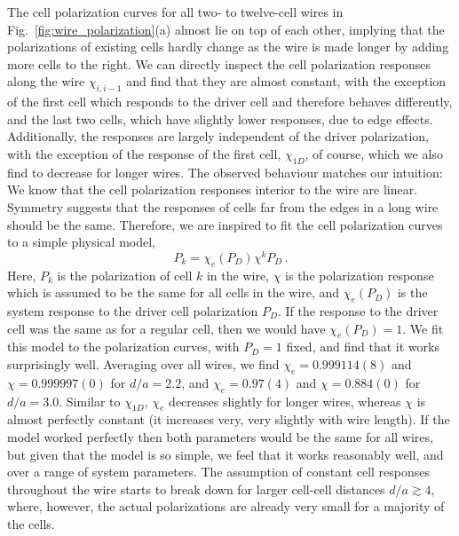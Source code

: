 The cell polarization curves for all two- to twelve-cell wires in
Fig.~\ref{fig:wire_polarization}(a) almost lie on top of each other, implying
that the polarizations of existing cells hardly change as the wire is made
longer by adding more cells to the right. We can directly inspect the cell
polarization responses along the wire $\chi_{i,i-1}$ and find that they are
almost constant, with the exception of the first cell which responds to the
driver cell and therefore behaves differently, and the last two cells, which
have slightly lower responses, due to edge effects. Additionally, the responses
are largely independent of the driver polarization, with the exception of the
response of the first cell, $\chi_{1D}$, of course, which we also find to
decrease for longer wires. The observed behaviour matches our intuition: We
know that the cell polarization responses interior to the wire are linear.
Symmetry suggests that the responses of cells far from the edges in a long wire
should be the same. Therefore, we are inspired to fit the cell polarization
curves to a simple physical model, 
%
\begin{equation}
  \label{eq:simple_model}
  P_k = \chi_e(P_D) \chi^k P_D \, .
\end{equation}
%
Here, $P_k$ is the polarization of cell $k$ in the wire, $\chi$ is the
polarization response which is assumed to be the same for all cells in the wire,
and $\chi_e(P_D)$ is the system response to the driver cell polarization $P_D$.
If the response to the driver cell was the same as for a regular cell, then we
would have $\chi_e(P_D) = 1$. We fit this model to the polarization curves, with
$P_D = 1$ fixed, and find that it works surprisingly well. Averaging over all
wires, we find $\chi_e = 0.999114(8)$ and $\chi = 0.999997(0)$ for $d/a=2.2$,
and $\chi_e = 0.97(4)$ and $\chi = 0.884(0)$ for $d/a = 3.0$. Similar to
$\chi_{1D}$, $\chi_e$ decreases slightly for longer wires, whereas $\chi$ is
almost perfectly constant (it increases very, very slightly with wire length).
If the model worked perfectly then both parameters would be the same for all
wires, but given that the model is so simple, we feel that it works reasonably
well, and over a range of system parameters. The assumption of constant cell
responses throughout the wire starts to break down for larger cell-cell
distances $d/a \gtrsim 4$, where, however, the actual polarizations are already
very small for a majority of the cells.


